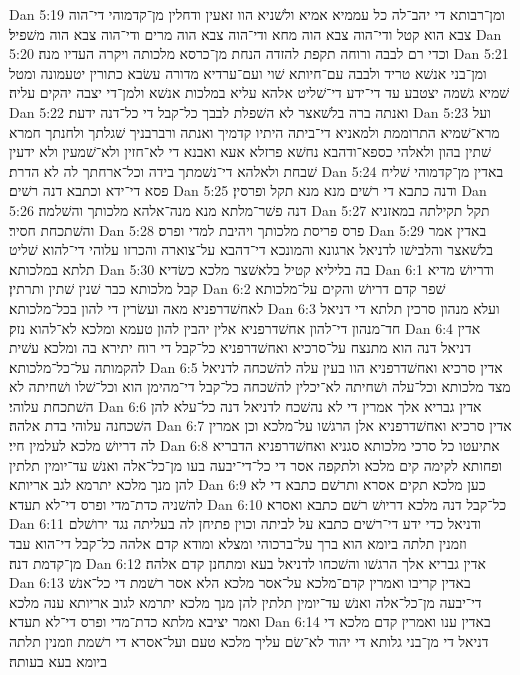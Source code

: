 Dan 5:19  ומן־רבותא די יהב־לה כל עממיא אמיא ולשׁניא הוו זאעין ודחלין מן־קדמוהי די־הוה צבא הוא קטל ודי־הוה צבא הוה מחא ודי־הוה צבא הוה מרים ודי־הוה צבא הוה משׁפיל׃
Dan 5:20  וכדי רם לבבה ורוחה תקפת להזדה הנחת מן־כרסא מלכותה ויקרה העדיו מנה׃
Dan 5:21  ומן־בני אנשׁא טריד ולבבה עם־חיותא שׁוי ועם־ערדיא מדורה עשׂבא כתורין יטעמונה ומטל שׁמיא גשׁמה יצטבע עד די־ידע די־שׁליט אלהא עליא במלכות אנשׁא ולמן־די יצבה יהקים עליה׃
Dan 5:22  ואנתה ברה בלשׁאצר לא השׁפלת לבבך כל־קבל די כל־דנה ידעת׃
Dan 5:23  ועל מרא־שׁמיא התרוממת ולמאניא די־ביתה היתיו קדמיך ואנתה ורברבניך שׁגלתך ולחנתך חמרא שׁתין בהון ולאלהי כספא־ודהבא נחשׁא פרזלא אעא ואבנא די לא־חזין ולא־שׁמעין ולא ידעין שׁבחת ולאלהא די־נשׁמתך בידה וכל־ארחתך לה לא הדרת׃
Dan 5:24  באדין מן־קדמוהי שׁליח פסא די־ידא וכתבא דנה רשׁים׃
Dan 5:25  ודנה כתבא די רשׁים מנא מנא תקל ופרסין׃
Dan 5:26  דנה פשׁר־מלתא מנא מנה־אלהא מלכותך והשׁלמה׃
Dan 5:27  תקל תקילתה במאזניא והשׁתכחת חסיר׃
Dan 5:28  פרס פריסת מלכותך ויהיבת למדי ופרס׃
Dan 5:29  באדין אמר בלשׁאצר והלבישׁו לדניאל ארגונא והמונכא די־דהבא על־צוארה והכרזו עלוהי די־להוא שׁליט תלתא במלכותא׃
Dan 5:30  בה בליליא קטיל בלאשׁצר מלכא כשׂדיא׃
Dan 6:1  ודריושׁ מדיא קבל מלכותא כבר שׁנין שׁתין ותרתין׃
Dan 6:2  שׁפר קדם דריושׁ והקים על־מלכותא לאחשׁדרפניא מאה ועשׂרין די להון בכל־מלכותא׃
Dan 6:3  ועלא מנהון סרכין תלתא די דניאל חד־מנהון די־להון אחשׁדרפניא אלין יהבין להון טעמא ומלכא לא־להוא נזק׃
Dan 6:4  אדין דניאל דנה הוא מתנצח על־סרכיא ואחשׁדרפניא כל־קבל די רוח יתירא בה ומלכא עשׁית להקמותה על־כל־מלכותא׃
Dan 6:5  אדין סרכיא ואחשׁדרפניא הוו בעין עלה להשׁכחה לדניאל מצד מלכותא וכל־עלה ושׁחיתה לא־יכלין להשׁכחה כל־קבל די־מהימן הוא וכל־שׁלו ושׁחיתה לא השׁתכחת עלוהי׃
Dan 6:6  אדין גבריא אלך אמרין די לא נהשׁכח לדניאל דנה כל־עלא להן השׁכחנה עלוהי בדת אלהה׃
Dan 6:7  אדין סרכיא ואחשׁדרפניא אלן הרגשׁו על־מלכא וכן אמרין לה דריושׁ מלכא לעלמין חיי׃
Dan 6:8  אתיעטו כל סרכי מלכותא סגניא ואחשׁדרפניא הדבריא ופחותא לקימה קים מלכא ולתקפה אסר די כל־די־יבעה בעו מן־כל־אלה ואנשׁ עד־יומין תלתין להן מנך מלכא יתרמא לגב אריותא׃
Dan 6:9  כען מלכא תקים אסרא ותרשׁם כתבא די לא להשׁניה כדת־מדי ופרס די־לא תעדא׃
Dan 6:10  כל־קבל דנה מלכא דריושׁ רשׁם כתבא ואסרא׃
Dan 6:11  ודניאל כדי ידע די־רשׁים כתבא על לביתה וכוין פתיחן לה בעליתה נגד ירושׁלם וזמנין תלתה ביומא הוא ברך על־ברכוהי ומצלא ומודא קדם אלהה כל־קבל די־הוא עבד מן־קדמת דנה׃
Dan 6:12  אדין גבריא אלך הרגשׁו והשׁכחו לדניאל בעא ומתחנן קדם אלהה׃
Dan 6:13  באדין קריבו ואמרין קדם־מלכא על־אסר מלכא הלא אסר רשׁמת די כל־אנשׁ די־יבעה מן־כל־אלה ואנשׁ עד־יומין תלתין להן מנך מלכא יתרמא לגוב אריותא ענה מלכא ואמר יציבא מלתא כדת־מדי ופרס די־לא תעדא׃
Dan 6:14  באדין ענו ואמרין קדם מלכא די דניאל די מן־בני גלותא די יהוד לא־שׂם עליך מלכא טעם ועל־אסרא די רשׁמת וזמנין תלתה ביומא בעא בעותה׃
